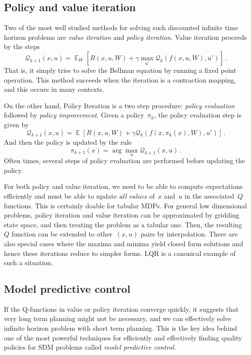 \documentclass{tufte-book}
\begin{document}
\hypertarget{policy-and-value-iteration}{%
\subsection{Policy and value
iteration}\label{policy-and-value-iteration}}

Two of the most well studied methods for solving such discounted
infinite time horizon problems are \emph{value iteration} and
\emph{policy iteration}.
Value iteration proceeds by the steps \[
    \mathcal{Q}_{k+1} (x,u) = \mathop\mathbb{E}_{W} \left[ R(x,u,W) + \gamma  \max_{u'} \mathcal{Q}_k (f(x,u,W),u')\right]\,.
\] That is, it simply tries to solve the Bellman equation by running a
fixed point operation. This method succeeds when the iteration is a
contraction mapping, and this occurs in many contexts.

On the other hand, Policy Iteration is a two step procedure:
\emph{policy evaluation} followed by \emph{policy improvement}. Given a
policy~\(\pi_k\), the policy evaluation step is given by \[
    \mathcal{Q}_{k+1} (x,u) = \mathop\mathbb{E} \left[  R(x,u,W) + \gamma \mathcal{Q}_k (f(x,\pi_k(x),W),u')\right]\,.
\] And then the policy is updated by the rule \[
    \pi_{k+1}(x) = \arg\max_u \mathcal{Q}_{k+1} (x,u)\,.
\] Often times, several steps of policy evaluation are performed before
updating the policy.

For both policy and value iteration, we need to be able to compute
expectations efficiently and must be able to update \emph{all values}
of~\(x\) and~\(u\) in the associated~\(Q\) functions. This is certainly
doable for tabular MDPs. For general low dimensional problems, policy
iteration and value iteration can be approximated by gridding state
space, and then treating the problem as a tabular one. Then, the
resulting~\(Q\) function can be extended to other~\((x,u)\) pairs by
interpolation. There are also special cases where the maxima and minima
yield closed form solutions and hence these iterations reduce to simpler
forms. LQR is a canonical example of such a situation.

\hypertarget{model-predictive-control}{%
\subsection{Model predictive control}\label{model-predictive-control}}


If the Q-functions in value or policy iteration converge quickly, it
suggests that very long term planning might not be necessary, and we can
effectively solve infinite horizon problem with short term planning.
This is the key idea behind one of the most powerful techniques for
efficiently and effectively finding quality policies for SDM problems
called \emph{model predictive control}.
\end{document}
